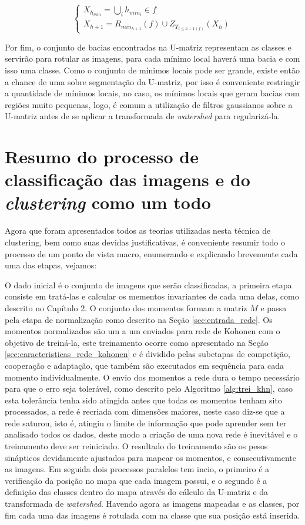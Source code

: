 \begin{equation}\label{eq:watershed_recursao}
  \left\{
    \begin{array}{l}
      X_{h_{min}} = \bigcup_i h_{min_{i}} \in f \\
      X_{h + 1} = R_{min_{h + 1}}(f) \cup Z_{T_{t \le {h + 1}(f)}}(X_h)
    \end{array}
  \right.
\end{equation}

Por fim, o conjunto de bacias encontradas na U-matriz representam as classes e
servirão para rotular as imagens, para cada mínimo local haverá uma bacia e com
isso uma classe. Como o conjunto de mínimos locais pode ser grande, existe então
a chance de uma sobre segmentação da U-matriz, por isso é conveniente restringir
a quantidade de mínimos locais, no caso, os mínimos locais que geram bacias
com regiões muito pequenas, logo, é comum a utilização de filtros gaussianos
sobre a U-matriz antes de se aplicar a transformada de \textit{watershed} para
regularizá-la.

\section{Resumo do processo de classificação das imagens e do \textit{clustering}
como um todo}\label{sec:resumo_clustering}

Agora que foram apresentados todos as teorias utilizadas nesta técnica de
clustering, bem como suas devidas justificativas, é conveniente resumir todo o
processo de um ponto de vista macro, enumerando e explicando brevemente cada uma
das etapas, vejamos:

O dado inicial é o conjunto de imagens que serão classificadas, a primeira etapa
consiste em tratá-las e calcular os mementos invariantes de cada uma delas, como
descrito no Capítulo 2. O conjunto dos momentos formam a matriz $ M $ e passa
pela etapa de normalização como descrito na Seção \ref{sec:entrada_rede}. Os
momentos normalizados são um a um enviados para rede de Kohonen com o objetivo
de treiná-la, este treinamento ocorre como apresentado na
Seção \ref{sec:caracteristicas_rede_kohonen} e é dividido pelas subetapas de
competição, cooperação e adaptação, que também são executados em sequência para
cada momento individualmente. O envio dos momentos a rede dura o tempo
necessário para que o erro seja tolerável, como descrito pelo
Algoritmo \ref{alg:trei_khn}, caso esta tolerância tenha sido atingida antes
que todas os momentos tenham sito processados, a rede é recriada com dimensões
maiores, neste caso diz-se que a rede saturou, isto é, atingiu o limite de
informação que pode aprender sem ter analisado todos os dados, deste modo a
criação de uma nova rede é inevitável e o treinamento deve ser reiniciado. O
resultado do treinamento são os pesos sinápticos devidamente ajustados para
mapear os momentos, e consecutivamente as imagens. Em seguida dois processos
paralelos tem incio, o primeiro é a verificação da posição no mapa que cada
imagem possui, e o segundo é a definição das classes dentro do mapa através do
cálculo da U-matriz e da transformada de \textit{watershed}. Havendo agora as
imagens mapeadas e as classes, por fim cada uma das imagens é rotulada com na
classe que sua posição está inserida.

